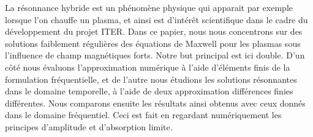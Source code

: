 La r\'esonnance hybride est un ph\'enom\`ene physique qui apparait par exemple lorsque l'on chauffe un plasma, et 
ainsi est d'int\'er\^et scientifique dans le cadre du d\'eveloppement  du projet ITER. Dans ce papier, nous nous concentrons sur des solutions faiblement r\'eguli\`eres des \'equations de Maxwell pour les plasmas sous l'influence de champ magn\'etiques forts. Notre but principal est ici double. D'un c\^ot\'e nous \'evaluons l'approximation 
num\'erique \`a l'aide d'\'el\'ements finis de la formulation 
fr\'equentielle, et de l'autre nous \'etudions les solutions r\'esonnantes dans le domaine temporelle, \`a l'aide de deux approximation diff\'erences finies diff\'erentes. Nous comparons ensuite les r\'esultats ainsi obtenus avec ceux donn\'es dans le domaine fr\'equentiel. Ceci est fait en regardant num\'eriquement les principes d'amplitude et d'absorption limite.


